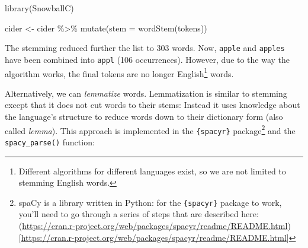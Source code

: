 \documentclass[
]{krantz}
\makeatletter
\newenvironment{Shaded}{\begin{snugshade}}{\end{snugshade}}
\newcommand{\AttributeTok}[1]{\textcolor[rgb]{0.61,0.61,0.61}{#1}}
\newcommand{\ConstantTok}[1]{\textcolor[rgb]{0,0,0}{#1}}
\newcommand{\FunctionTok}[1]{\textcolor[rgb]{0,0,0}{#1}}
\newcommand{\NormalTok}[1]{#1}
\newcommand{\OtherTok}[1]{\textcolor[rgb]{0.37,0.37,0.37}{#1}}
\newcommand{\SpecialCharTok}[1]{\textcolor[rgb]{0,0,0}{#1}}
\newcommand{\StringTok}[1]{\textcolor[rgb]{0.5,0.5,0.5}{#1}}
\newenvironment{kframe}{%
\medskip{}
\setlength{\fboxsep}{.8em}
 \def\at@end@of@kframe{}%
 \ifinner\ifhmode%
  \def\at@end@of@kframe{\end{minipage}}%
  \begin{minipage}{\columnwidth}%
 \fi\fi%
 \def\FrameCommand##1{\hskip\@totalleftmargin \hskip-\fboxsep
 \colorbox{shadecolor}{##1}\hskip-\fboxsep
     \hskip-\linewidth \hskip-\@totalleftmargin \hskip\columnwidth}%
 \MakeFramed {\advance\hsize-\width
   \@totalleftmargin\z@ \linewidth\hsize
   \@setminipage}}%
 {\par\unskip\endMakeFramed%
 \at@end@of@kframe}
\renewenvironment{Shaded}{\begin{kframe}}{\end{kframe}}
\makeatother
\begin{document}
\begin{Shaded}
\begin{Highlighting}[]
\FunctionTok{library}\NormalTok{(SnowballC)}

\NormalTok{cider }\OtherTok{\textless{}{-}}\NormalTok{ cider }\SpecialCharTok{\%\textgreater{}\%} 
  \FunctionTok{mutate}\NormalTok{(}\AttributeTok{stem =} \FunctionTok{wordStem}\NormalTok{(tokens))}
\end{Highlighting}
\end{Shaded}

The stemming reduced further the list to 303 words. Now, \texttt{apple} and \texttt{apples} have been combined into \texttt{appl} (106 occurrences). However, due to the way the algorithm works, the final tokens are no longer English\footnote{Different algorithms for different languages exist, so we are not limited to stemming English words.} words.

Alternatively, we can \emph{lemmatize} words. Lemmatization is similar to stemming except that it does not cut words to their stems: Instead it uses knowledge about the language's structure to reduce words down to their dictionary form (also called \emph{lemma}). This approach is implemented in the \texttt{\{spacyr\}} package\footnote{spaCy is a library written in Python: for the \texttt{\{spacyr\}} package to work, you'll need to go through a series of steps that are described here: (\url{https://cran.r-project.org/web/packages/spacyr/readme/README.html}){[}\url{https://cran.r-project.org/web/packages/spacyr/readme/README.html}{]}} and the \texttt{spacy\_parse()} function:

\begin{Shaded}
\end{Shaded}
\end{document}

